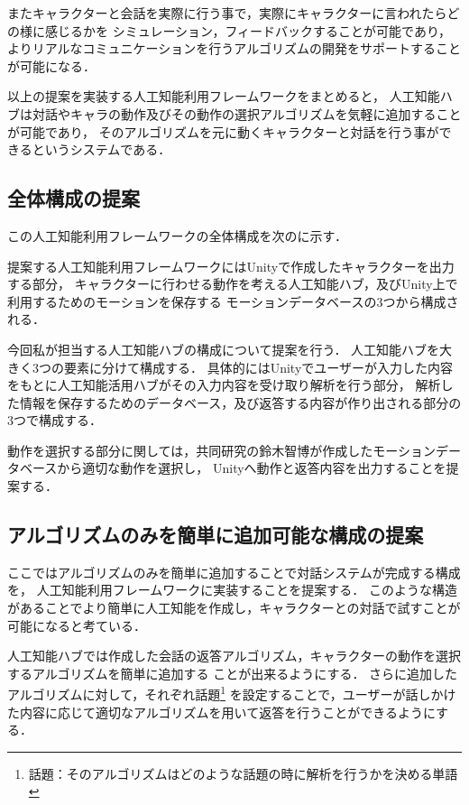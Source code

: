 またキャラクターと会話を実際に行う事で，実際にキャラクターに言われたらどの様に感じるかを
シミュレーション，フィードバックすることが可能であり，
よりリアルなコミュニケーションを行うアルゴリズムの開発をサポートすることが可能になる．

以上の提案を実装する人工知能利用フレームワークをまとめると，
人工知能ハブは対話やキャラの動作及びその動作の選択アルゴリズムを気軽に追加することが可能であり，
そのアルゴリズムを元に動くキャラクターと対話を行う事ができるというシステムである．
\subsection{全体構成の提案}\label{sec:allAr}
この人工知能利用フレームワークの全体構成を次のに示す．


提案する人工知能利用フレームワークにはUnityで作成したキャラクターを出力する部分，
キャラクターに行わせる動作を考える人工知能ハブ，及びUnity上で利用するためのモーションを保存する
モーションデータベースの3つから構成される．

今回私が担当する人工知能ハブの構成について提案を行う．
人工知能ハブを大きく3つの要素に分けて構成する．
具体的にはUnityでユーザーが入力した内容をもとに人工知能活用ハブがその入力内容を受け取り解析を行う部分，
解析した情報を保存するためのデータベース，及び返答する内容が作り出される部分の3つで構成する．

動作を選択する部分に関しては，共同研究の鈴木智博が作成したモーションデータベースから適切な動作を選択し，
Unityへ動作と返答内容を出力することを提案する．

\subsection{アルゴリズムのみを簡単に追加可能な構成の提案}
ここではアルゴリズムのみを簡単に追加することで対話システムが完成する構成を，
人工知能利用フレームワークに実装することを提案する．
このような構造があることでより簡単に人工知能を作成し，キャラクターとの対話で試すことが可能になると考ている．

人工知能ハブでは作成した会話の返答アルゴリズム，キャラクターの動作を選択するアルゴリズムを簡単に追加する
ことが出来るようにする．
さらに追加したアルゴリズムに対して，それぞれ話題\footnote{話題：そのアルゴリズムはどのような話題の時に解析を行うかを決める単語}
を設定することで，ユーザーが話しかけた内容に応じて適切なアルゴリズムを用いて返答を行うことができるようにする．

